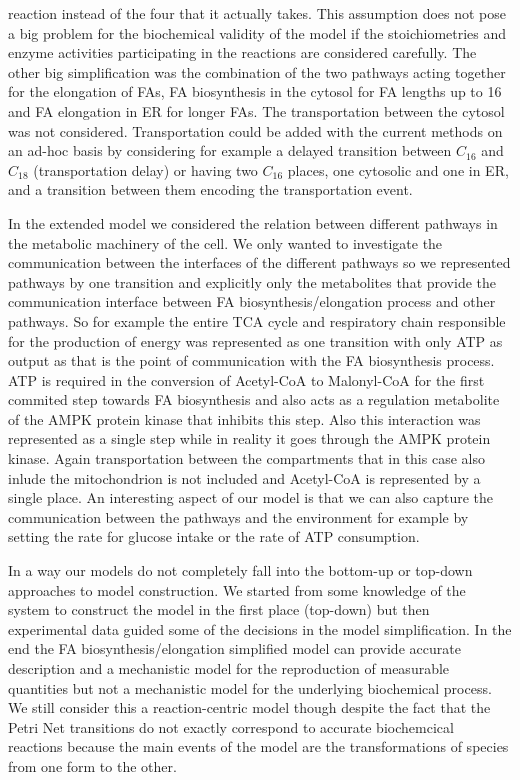 reaction instead of the four that it actually takes. This assumption does not pose a big problem for the
biochemical validity of the model if the stoichiometries and enzyme
activities participating in the reactions are considered
carefully. The other big simplification was the combination of the two
pathways acting together for the elongation of FAs, FA biosynthesis in
the cytosol
for FA lengths up to 16 and FA elongation in ER for longer FAs. The
transportation between the cytosol was not considered. Transportation
could be added with the current methods on an ad-hoc basis by
considering for example a delayed transition between $C_{16}$ and
$C_{18}$ (transportation delay) or having two $C_{16}$ places, one
cytosolic and one in ER, and a transition between them encoding the
transportation event.

In the extended model we considered the relation between different
pathways in the metabolic machinery of the cell. We only wanted to
investigate the communication between the interfaces of the different
pathways so we represented pathways by one transition and explicitly
only the metabolites that provide the communication interface between FA biosynthesis/elongation process and
other pathways. So for example the entire TCA cycle and respiratory chain
responsible for the production of energy was represented as one transition with
only ATP as output as that is the point of
communication with the FA biosynthesis process. ATP is required in the
conversion of Acetyl-CoA to Malonyl-CoA for the first commited step
towards FA biosynthesis and also acts as a regulation metabolite of
the AMPK protein kinase that inhibits this step. Also this interaction
was represented as a single step while in reality it goes through the
AMPK protein kinase. Again transportation between the compartments
that in this case also inlude the mitochondrion is not included and
Acetyl-CoA is represented by a single place. An interesting aspect of
our model is that we can also capture the communication between the
pathways and the environment for example by setting the rate for
glucose intake or the rate of ATP consumption.

In a way our models do not completely fall into the bottom-up or
top-down approaches to model construction. We started from some
knowledge of the system to construct the model in the first place
(top-down) but then experimental data guided some of the decisions in
the model simplification. In the end the FA biosynthesis/elongation
simplified model can provide accurate description and a mechanistic model for the reproduction of
measurable quantities but not a mechanistic model for the underlying
biochemical process. We still consider this a reaction-centric model
though despite the fact that the Petri Net transitions do not exactly
correspond to accurate biochemcical reactions because the main events of the model are the
transformations of species from one form to the other.

